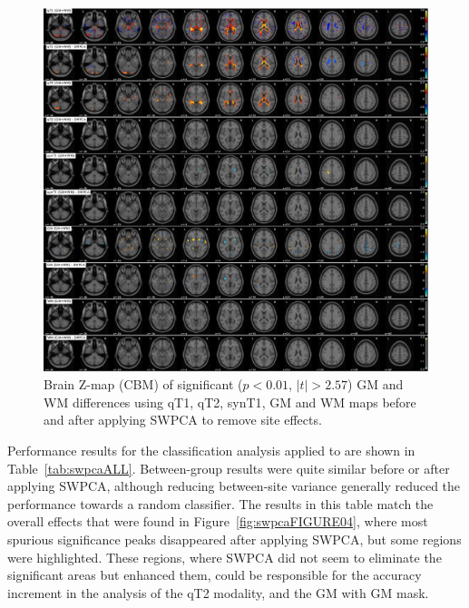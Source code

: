 \begin{figure}
	\centering
	\includegraphics[width=\linewidth]{Graphics/ch7/FIGURE05}
	\caption[Brain Z-map (\acs{CBM}) of significant ($p<0.01$, $|t|>2.57$) \acs{GM} and \acs{WM} differences using \acs{qT1}, \acs{qT2}, \acs{synT1}, \acs{GM} and \acs{WM} maps before and after applying \acs{SWPCA} to remove site effects.]{Brain Z-map (\ac{CBM}) of significant ($p<0.01$, $|t|>2.57$) \acs{GM} and \acs{WM} differences using \ac{qT1}, \ac{qT2}, \ac{synT1}, \ac{GM} and \ac{WM} maps before and after applying \ac{SWPCA} to remove site effects.}
	\label{fig:swpcaFIGURE05}
\end{figure}

Performance results for the classification analysis applied to \all{} are shown in Table~\ref{tab:swpcaALL}. Between-group results were quite similar before or after applying \ac{SWPCA}, although reducing between-site variance generally reduced the performance towards a random classifier. The results in this table match the overall effects that were found in Figure~\ref{fig:swpcaFIGURE04}, where most spurious significance peaks disappeared after applying \ac{SWPCA}, but some regions were highlighted. These regions, where \ac{SWPCA} did not seem to eliminate the significant areas but enhanced them, could be responsible for the accuracy increment in the analysis of the \ac{qT2} modality, and the \ac{GM} with GM mask.

